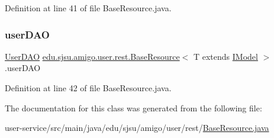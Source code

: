 Definition at line 41 of file Base\+Resource.\+java.

\mbox{\label{classedu_1_1sjsu_1_1amigo_1_1user_1_1rest_1_1_base_resource_a3bbc1d3a97b323849d429e68ba661fcc}} 
\subsubsection{\texorpdfstring{user\+D\+AO}{userDAO}}
{\footnotesize\ttfamily \hyperlink{classedu_1_1sjsu_1_1amigo_1_1user_1_1db_1_1dao_1_1_user_d_a_o}{User\+D\+AO} \hyperlink{classedu_1_1sjsu_1_1amigo_1_1user_1_1rest_1_1_base_resource}{edu.\+sjsu.\+amigo.\+user.\+rest.\+Base\+Resource}$<$ T extends \hyperlink{interfaceedu_1_1sjsu_1_1amigo_1_1db_1_1common_1_1model_1_1_i_model}{I\+Model} $>$.user\+D\+AO\hspace{0.3cm}{\ttfamily [protected]}}



Definition at line 42 of file Base\+Resource.\+java.



The documentation for this class was generated from the following file\+:\begin{DoxyCompactItemize}
\item 
user-\/service/src/main/java/edu/sjsu/amigo/user/rest/\hyperlink{_base_resource_8java}{Base\+Resource.\+java}\end{DoxyCompactItemize}
